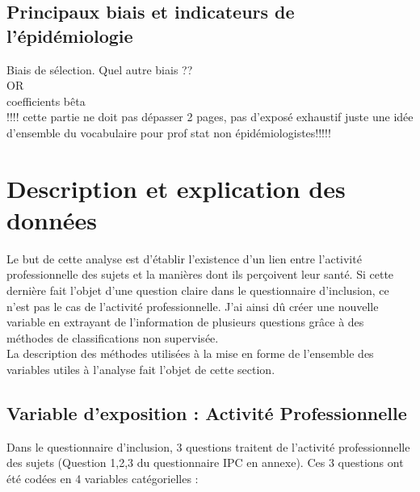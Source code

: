 \documentclass{book}
\begin{document}
\subsection{Principaux biais et indicateurs de l'épidémiologie}
\noindent
Biais de sélection. Quel autre biais ??\\
OR\\
coefficients bêta\\
!!!! cette partie ne doit pas dépasser 2 pages, pas d'exposé exhaustif juste une idée d'ensemble du vocabulaire pour prof stat non épidémiologistes!!!!!\\
\newpage
\section{Description et explication des données}
\noindent
Le but de cette analyse est d'établir l'existence d'un lien entre l'activité professionnelle des sujets et la manières dont ils perçoivent leur santé. Si cette dernière fait l'objet d'une question claire dans le questionnaire d'inclusion, ce n'est pas le cas de l'activité professionnelle. J'ai ainsi dû créer une nouvelle variable en extrayant de l'information de plusieurs questions grâce à des méthodes de classifications non supervisée.\\
La description des méthodes utilisées à la mise en forme de l'ensemble des variables utiles à l'analyse fait l'objet de cette section.
\subsection{Variable d'exposition : Activité Professionnelle}
\noindent
Dans le questionnaire d'inclusion, 3 questions traitent de l'activité professionnelle des sujets (Question 1,2,3 du questionnaire IPC en annexe). Ces 3 questions ont été codées en 4 variables catégorielles :
\end{document}
